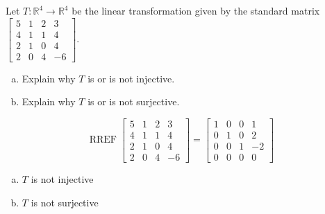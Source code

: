 
\begin{exerciseStatement}
 Let \(T:\mathbb{R}^ 4  \to \mathbb{R}^ 4 \) be the linear transformation given by the standard matrix \( \left[\begin{array}{cccc}
5 & 1 & 2 & 3 \\
4 & 1 & 1 & 4 \\
2 & 1 & 0 & 4 \\
2 & 0 & 4 & -6
\end{array}\right] .\)
\begin{enumerate}[(a)]
\item Explain why \(T\) is or is not injective.
\item Explain why \(T\) is or is not surjective.
\end{enumerate}
    
\end{exerciseStatement}
    
\begin{exerciseAnswer} 


\[\operatorname{RREF} \left[\begin{array}{cccc}
5 & 1 & 2 & 3 \\
4 & 1 & 1 & 4 \\
2 & 1 & 0 & 4 \\
2 & 0 & 4 & -6
\end{array}\right] = \left[\begin{array}{cccc}
1 & 0 & 0 & 1 \\
0 & 1 & 0 & 2 \\
0 & 0 & 1 & -2 \\
0 & 0 & 0 & 0
\end{array}\right] \]


\begin{enumerate}[(a)]
\item \(T\) is not injective
\item \(T\) is not surjective
\end{enumerate}
    
\end{exerciseAnswer}
    

